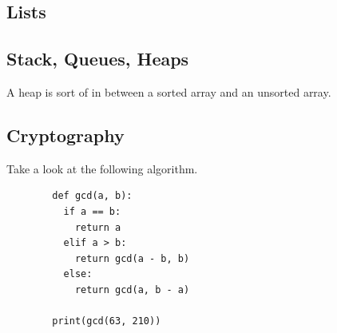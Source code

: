\documentclass{article}
\begin{document}
    \begin{definition}[Factorial]
      
    \end{definition}
  
  \subsection{Lists} 

    \begin{definition}
      
    \end{definition}

    \begin{definition}

    \end{definition}

    \begin{definition}
      
    \end{definition}

  \subsection{Stack, Queues, Heaps}

    A heap is sort of in between a sorted array and an unsorted array. 

  \subsection{Cryptography} 

    \begin{example}
      Take a look at the following algorithm. 
      \begin{lstlisting}
        def gcd(a, b): 
          if a == b: 
            return a
          elif a > b: 
            return gcd(a - b, b) 
          else: 
            return gcd(a, b - a)

        print(gcd(63, 210))
      \end{lstlisting}
    \end{example}

    \begin{definition}
      
    \end{definition}

    \begin{definition}
      
    \end{definition}
\end{document}
